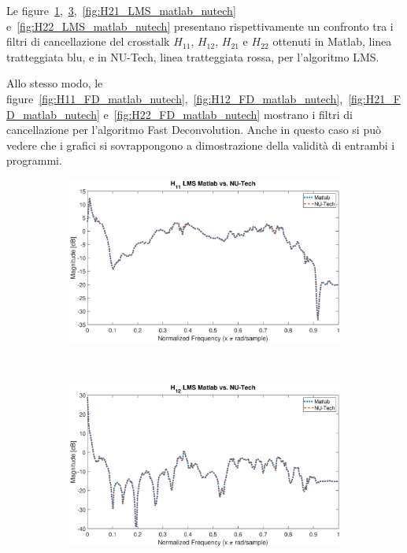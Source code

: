 \documentclass[12pt,a4paper,titlepage]{article}
\begin{document}
Le figure~\ref{fig:H11_LMS_matlab_nutech},~\ref{fig:H12_LMS_matlab_nutech},~\ref{fig:H21_LMS_matlab_nutech} e~\ref{fig:H22_LMS_matlab_nutech} presentano rispettivamente un confronto tra i filtri di cancellazione del crosstalk  $H_{11}$, $H_{12}$, $H_{21}$ e $H_{22}$ ottenuti in Matlab, linea tratteggiata blu, e in NU-Tech, linea tratteggiata rossa, per l'algoritmo LMS.

Allo stesso modo, le figure~\ref{fig:H11_FD_matlab_nutech},~\ref{fig:H12_FD_matlab_nutech},~\ref{fig:H21_FD_matlab_nutech} e~\ref{fig:H22_FD_matlab_nutech} mostrano i filtri di cancellazione per l'algoritmo Fast Deconvolution. Anche in questo caso si può vedere che i grafici si sovrappongono a dimostrazione della validità di entrambi i programmi.
\begin{figure}[h]
	\centering
	\begin{subfigure}{1\textwidth}
		\includegraphics[width=1\textwidth]{Immagini/H11_LMS_matlab_nutech}
		\caption{}
		\label{fig:H11_LMS_matlab_nutech}
	\end{subfigure}\\
	\begin{subfigure}{1\textwidth}
			\includegraphics[width=1\textwidth]{Immagini/H12_LMS_matlab_nutech}
			\caption{}
			\label{fig:H12_LMS_matlab_nutech}
	\end{subfigure}
\end{figure}
\end{document}
